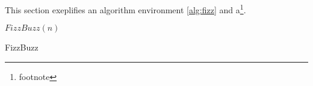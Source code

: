 
This section exeplifies an algorithm environment \ref{alg:fizz} and
a\footnote{footnote}.

\begin{algorithm}{$FizzBuzz(n)$}
    \caption{FizzBuzz}
    \label{alg:fizz}
    \begin{algorithmic}[2]
            \ELSE
            \ENDIF
        \ENDFOR
    \end{algorithmic}
\end{algorithm}
